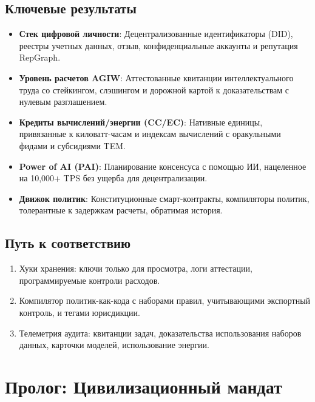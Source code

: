 \documentclass[11pt]{article}
\begin{document}
\subsection{Ключевые результаты}
\begin{itemize}[noitemsep]
  \item \textbf{Стек цифровой личности}: Децентрализованные идентификаторы (DID), реестры учетных данных, отзыв, конфиденциальные аккаунты и репутация RepGraph.
  \item \textbf{Уровень расчетов AGIW}: Аттестованные квитанции интеллектуального труда со стейкингом, слэшингом и дорожной картой к доказательствам с нулевым разглашением.
  \item \textbf{Кредиты вычислений/энергии (CC/EC)}: Нативные единицы, привязанные к киловатт-часам и индексам вычислений с оракульными фидами и субсидиями TEM.
  \item \textbf{Power of AI (PAI)}: Планирование консенсуса с помощью ИИ, нацеленное на 10,000+ TPS без ущерба для децентрализации.
  \item \textbf{Движок политик}: Конституционные смарт-контракты, компиляторы политик, толерантные к задержкам расчеты, обратимая история.
\end{itemize}

\subsection{Путь к соответствию}
\begin{enumerate}[noitemsep]
  \item Хуки хранения: ключи только для просмотра, логи аттестации, программируемые контроли расходов.
  \item Компилятор политик-как-кода с наборами правил, учитывающими экспортный контроль, и тегами юрисдикции.
  \item Телеметрия аудита: квитанции задач, доказательства использования наборов данных, карточки моделей, использование энергии.
\end{enumerate}

\section{Пролог: Цивилизационный мандат}
\end{document}
